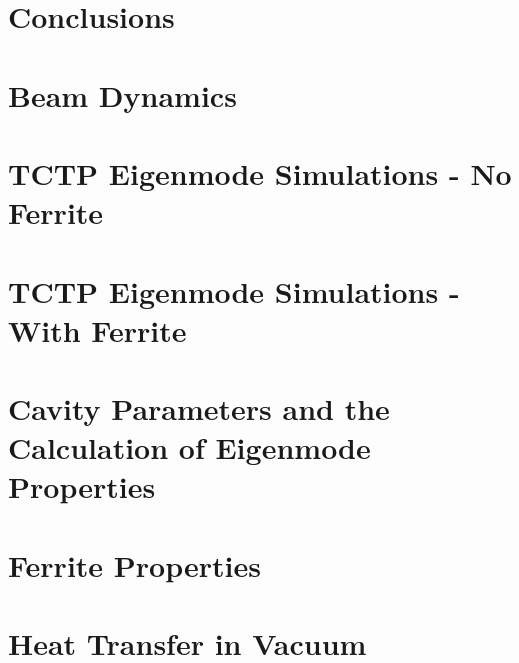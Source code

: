 \documentclass[12pt,PhD]{Thesis}
\begin{document}
\chapter{Conclusions}





\appendix{}
\chapter{Beam Dynamics}
\label{app:BeamDyn}



\chapter{TCTP Eigenmode Simulations - No Ferrite}
\label{app:tctp-eigenmodes}

\chapter{TCTP Eigenmode Simulations - With Ferrite}

\chapter{Cavity Parameters and the Calculation of Eigenmode Properties}

\chapter{Ferrite Properties}

\chapter{Heat Transfer in Vacuum}

\end{document}
